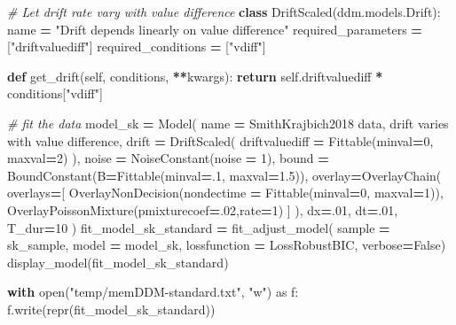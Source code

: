\documentclass[
]{book}
\newenvironment{Shaded}{\begin{snugshade}}{\end{snugshade}}
\newcommand{\BuiltInTok}[1]{#1}
\newcommand{\CommentTok}[1]{\textcolor[rgb]{0.56,0.35,0.01}{\textit{#1}}}
\newcommand{\ControlFlowTok}[1]{\textcolor[rgb]{0.13,0.29,0.53}{\textbf{#1}}}
\newcommand{\DecValTok}[1]{\textcolor[rgb]{0.00,0.00,0.81}{#1}}
\newcommand{\FloatTok}[1]{\textcolor[rgb]{0.00,0.00,0.81}{#1}}
\newcommand{\ImportTok}[1]{#1}
\newcommand{\KeywordTok}[1]{\textcolor[rgb]{0.13,0.29,0.53}{\textbf{#1}}}
\newcommand{\NormalTok}[1]{#1}
\newcommand{\OperatorTok}[1]{\textcolor[rgb]{0.81,0.36,0.00}{\textbf{#1}}}
\newcommand{\StringTok}[1]{\textcolor[rgb]{0.31,0.60,0.02}{#1}}
\newcommand{\VariableTok}[1]{\textcolor[rgb]{0.00,0.00,0.00}{#1}}
\begin{document}
\begin{Shaded}
\begin{Highlighting}[]
\CommentTok{\# Let drift rate vary with value difference}
\KeywordTok{class}\NormalTok{ DriftScaled(ddm.models.Drift):}
\NormalTok{  name }\OperatorTok{=} \StringTok{"Drift depends linearly on value difference"}
\NormalTok{  required\_parameters }\OperatorTok{=}\NormalTok{ [}\StringTok{"driftvaluediff"}\NormalTok{]}
\NormalTok{  required\_conditions }\OperatorTok{=}\NormalTok{ [}\StringTok{"vdiff"}\NormalTok{]}
  
  \KeywordTok{def}\NormalTok{ get\_drift(}\VariableTok{self}\NormalTok{, conditions, }\OperatorTok{**}\NormalTok{kwargs):}
    \ControlFlowTok{return} \VariableTok{self}\NormalTok{.driftvaluediff }\OperatorTok{*}\NormalTok{ conditions[}\StringTok{"vdiff"}\NormalTok{]}

\CommentTok{\# fit the data}
\NormalTok{model\_sk }\OperatorTok{=}\NormalTok{ Model(}
\NormalTok{  name }\OperatorTok{=} \StringTok{\textquotesingle{}SmithKrajbich2018 data, drift varies with value difference\textquotesingle{}}\NormalTok{,}
\NormalTok{  drift }\OperatorTok{=}\NormalTok{ DriftScaled(}
\NormalTok{    driftvaluediff }\OperatorTok{=}\NormalTok{ Fittable(minval}\OperatorTok{=}\DecValTok{0}\NormalTok{, maxval}\OperatorTok{=}\DecValTok{2}\NormalTok{)}
\NormalTok{  ),}
\NormalTok{  noise }\OperatorTok{=}\NormalTok{ NoiseConstant(noise }\OperatorTok{=} \DecValTok{1}\NormalTok{),}
\NormalTok{  bound }\OperatorTok{=}\NormalTok{ BoundConstant(B}\OperatorTok{=}\NormalTok{Fittable(minval}\OperatorTok{=}\FloatTok{.1}\NormalTok{, maxval}\OperatorTok{=}\FloatTok{1.5}\NormalTok{)),}
\NormalTok{  overlay}\OperatorTok{=}\NormalTok{OverlayChain(}
\NormalTok{    overlays}\OperatorTok{=}\NormalTok{[}
\NormalTok{      OverlayNonDecision(nondectime }\OperatorTok{=}\NormalTok{ Fittable(minval}\OperatorTok{=}\DecValTok{0}\NormalTok{, maxval}\OperatorTok{=}\DecValTok{1}\NormalTok{)), }
\NormalTok{      OverlayPoissonMixture(pmixturecoef}\OperatorTok{=}\FloatTok{.02}\NormalTok{,rate}\OperatorTok{=}\DecValTok{1}\NormalTok{)}
\NormalTok{    ]}
\NormalTok{  ),}
\NormalTok{  dx}\OperatorTok{=}\FloatTok{.01}\NormalTok{, }
\NormalTok{  dt}\OperatorTok{=}\FloatTok{.01}\NormalTok{, }
\NormalTok{  T\_dur}\OperatorTok{=}\DecValTok{10}
\NormalTok{)}
\NormalTok{fit\_model\_sk\_standard }\OperatorTok{=}\NormalTok{ fit\_adjust\_model(}
\NormalTok{  sample }\OperatorTok{=}\NormalTok{ sk\_sample, }
\NormalTok{  model }\OperatorTok{=}\NormalTok{ model\_sk,}
\NormalTok{  lossfunction }\OperatorTok{=}\NormalTok{ LossRobustBIC,}
\NormalTok{  verbose}\OperatorTok{=}\VariableTok{False}\NormalTok{)}
\NormalTok{display\_model(fit\_model\_sk\_standard)}

\ControlFlowTok{with} \BuiltInTok{open}\NormalTok{(}\StringTok{"temp/memDDM{-}standard.txt"}\NormalTok{, }\StringTok{"w"}\NormalTok{) }\ImportTok{as}\NormalTok{ f:}
\NormalTok{    f.write(}\BuiltInTok{repr}\NormalTok{(fit\_model\_sk\_standard))}
\end{Highlighting}
\end{Shaded}
\end{document}
